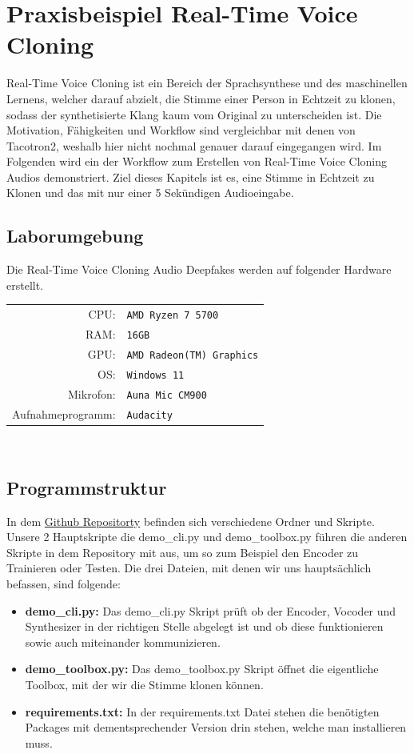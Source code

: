 \section{Praxisbeispiel Real-Time Voice Cloning}
Real-Time Voice Cloning ist ein Bereich der Sprachsynthese und des maschinellen Lernens, welcher darauf abzielt, die Stimme einer Person in Echtzeit zu klonen, sodass der synthetisierte Klang kaum vom Original zu unterscheiden ist.\newline
Die Motivation, Fähigkeiten und Workflow sind vergleichbar mit denen von Tacotron2, weshalb hier nicht nochmal genauer darauf eingegangen wird.\newline
Im Folgenden wird ein der Workflow zum Erstellen von Real-Time Voice Cloning Audios demonstriert. Ziel dieses Kapitels ist es, eine Stimme in Echtzeit zu Klonen und das mit nur einer 5 Sekündigen Audioeingabe.
\subsection{Laborumgebung}
Die Real-Time Voice Cloning Audio Deepfakes werden auf folgender Hardware erstellt.\\[0.5cm]
\begin{tabular}{rl}
    CPU:& \texttt{AMD Ryzen 7 5700}\\
    RAM:& \texttt{16GB}\\
    GPU:& \texttt{AMD Radeon(TM) Graphics}\\
    OS:& \texttt{Windows 11}\\
    Mikrofon:& \texttt{Auna Mic CM900}\\
    Aufnahmeprogramm:& \texttt{Audacity}
\end{tabular}\\[0.5cm]
\subsection{Programmstruktur}
In dem \href{https://github.com/CorentinJ/Real-Time-Voice-Cloning}{Github Repositorty} befinden sich verschiedene Ordner und Skripte. Unsere 2 Hauptskripte die demo\_cli.py und demo\_toolbox.py führen die anderen Skripte in dem Repository mit aus, um so zum Beispiel den Encoder zu Trainieren oder Testen.
Die drei Dateien, mit denen wir uns hauptsächlich befassen, sind folgende:
\begin{itemize}
    \item \textbf{demo\_cli.py:} Das demo\_cli.py Skript prüft ob der Encoder, Vocoder und Synthesizer in der richtigen Stelle abgelegt ist und ob diese funktionieren sowie auch miteinander kommunizieren.
    \item \textbf{demo\_toolbox.py:} Das demo\_toolbox.py Skript öffnet die eigentliche Toolbox, mit der wir die Stimme klonen können.
    \item \textbf{requirements.txt:} In der requirements.txt Datei stehen die benötigten Packages mit dementsprechender Version drin stehen, welche man installieren muss.
\end{itemize}

